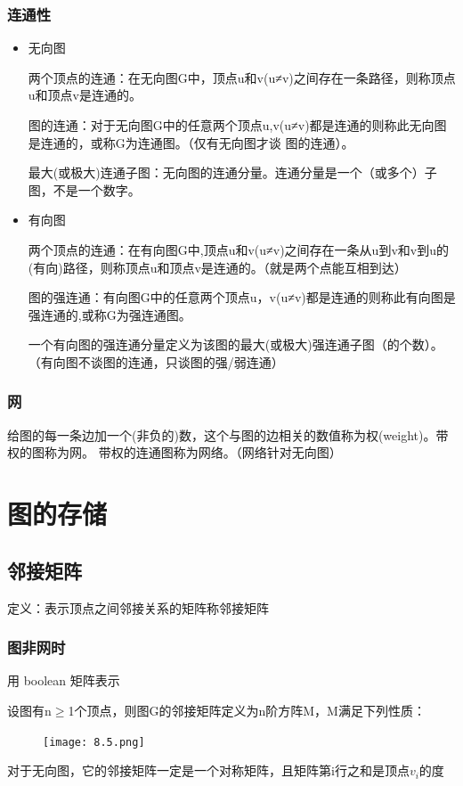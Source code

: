 \documentclass[AutoFakeBold]{LZUThesis2007}
\begin{document}
			\subsubsection{连通性}
\begin{itemize}
	\item 无向图

两个顶点的连通：在无向图G中，顶点u和v(u≠v)之间存在一条路径，则称顶点u和顶点v是连通的。

图的连通：对于无向图G中的任意两个顶点u,v(u≠v)都是连通的则称此无向图是连通的，或称G为连通图。（仅有无向图才谈 图的连通）。

最大(或极大)连通子图：无向图的连通分量。连通分量是一个（或多个）子图，不是一个数字。
	\item 有向图

两个顶点的连通：在有向图G中,顶点u和v(u≠v)之间存在一条从u到v和v到u的(有向)路径，则称顶点u和顶点v是连通的。（就是两个点能互相到达）

图的强连通：有向图G中的任意两个顶点u，v(u≠v)都是连通的则称此有向图是强连通的,或称G为强连通图。

一个有向图的强连通分量定义为该图的最大(或极大)强连通子图（的个数）。（有向图不谈图的连通，只谈图的强/弱连通）
\end{itemize}

			\subsubsection{网}
给图的每一条边加一个(非负的)数，这个与图的边相关的数值称为权(weight)。带权的图称为网。
带权的连通图称为网络。（网络针对无向图）

	\section{图的存储}			
		\subsection{邻接矩阵}
定义：表示顶点之间邻接关系的矩阵称邻接矩阵
			\subsubsection{图非网时}
用 boolean 矩阵表示

设图有n$\ge$1个顶点，则图G的邻接矩阵定义为n阶方阵M，M满足下列性质：
\begin{figure}[H]
    \centering
    \texttt{[image: 8.5.png]}
    
    \label{fig_install_texlive}
\end{figure}
对于无向图，它的邻接矩阵一定是一个对称矩阵，且矩阵第i行之和是顶点$v_{i}$的度
\end{document}
